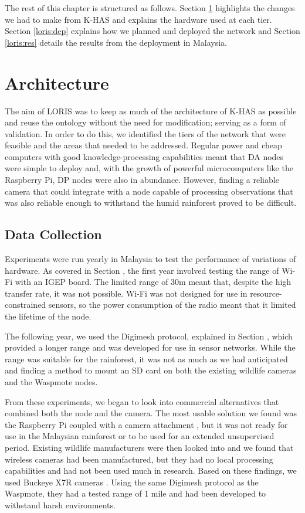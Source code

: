 	The rest of this chapter is structured as follows. Section \ref{loris:arch} highlights the changes we had to make from K-HAS and explains the hardware used at each tier. Section \ref{loris:dep} explains how we planned and deployed the network and Section \ref{loris:res} details the results from the deployment in Malaysia.
	
	\section{Architecture}\label{loris:arch}
		The aim of LORIS was to keep as much of the architecture of K-HAS as possible and reuse the ontology without the need for modification; serving as a form of validation. In order to do this, we identified the tiers of the network that were feasible and the areas that needed to be addressed. Regular power and cheap computers with good knowledge-processing capabilities meant that DA nodes were simple to deploy and, with the growth of powerful microcomputers like the Raspberry Pi, DP nodes were also in abundance. However, finding a reliable camera that could integrate with a node capable of processing observations that was also reliable enough to withstand the humid rainforest proved to be difficult.
		
		\subsection{Data Collection}
				Experiments were run yearly in Malaysia to test the performance of variations of hardware. As covered in Section \label{tech:wifirange}, the first year involved testing the range of Wi-Fi with an IGEP board. The limited range of 30m meant that, despite the high transfer rate, it was not possible. Wi-Fi was not designed for use in resource-constrained sensors, so the power consumption of the radio meant that it limited the lifetime of the node.
				
				The following year, we used the Digimesh protocol, explained in Section \label{tech:digimesh}, which provided a longer range and was developed for use in sensor networks.  While the range was suitable for the rainforest, it was not as much as we had anticipated and finding a method to mount an SD card on both the existing wildlife cameras and the Waspmote nodes. 
				
				From these experiments, we began to look into commercial alternatives that combined both the node and the camera. The most usable solution we found was the Raspberry Pi coupled with a camera attachment \cite{REFERENCE}, but it was not ready for use in the Malaysian rainforest or to be used for an extended unsupervised period. Existing wildlife manufacturers were then looked into and we found that wireless cameras had been manufactured, but they had no local processing capabilities and had not been used much in research. Based on these findings, we used Buckeye X7R cameras \cite{buckeye}. Using the same Digimesh protocol as the Waspmote, they had a tested range of 1 mile and had been developed to withstand harsh environments.
				
